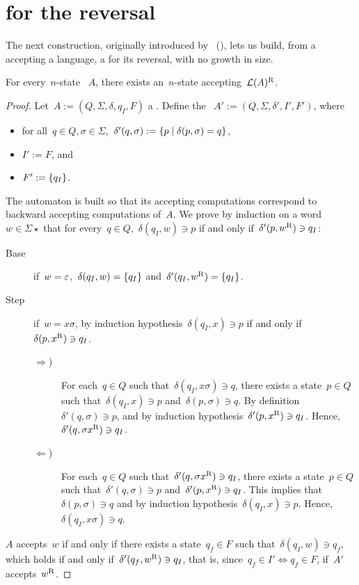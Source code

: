 \section{\texorpdfstring{\ONFA}{1NFA} for the reversal}\label{sub:reversal}
The next construction, originally introduced by~\citeauthor{RabSco59} (\cite{RabSco59}), lets us build, from a \ONFA accepting a language, a \ONFA for its reversal, with no growth in size.
\begin{thrm}
	For every~$n$-state \ONFA~$A$, there exists an~$n$-state \ONFA accepting~$\mathcal L(A)^{\mathrm R}$.
\end{thrm}
\begin{proof}
	Let~$A:=(Q,\Sigma,\delta,q_I,F)$ a \ONFA.
	Define the \ONFA~$A':=(Q,\Sigma,\delta',I',F')$, where
	\begin{itemize}
		\item for all~$q\in Q,\sigma\in\Sigma$,~$\delta'(q,\sigma):=\{p \mid \delta(p,\sigma)=q\}$,
		\item $I':=F$, and
		\item $F':=\{q_I\}$.
	\end{itemize}
	The automaton is built so that its accepting computations correspond to backward accepting computations of~$A$.
	We prove by induction on a word~$w\in\Sigma\star$ that for every~$q\in Q$,~$\delta(q_I,w)\ni p$ if and only if~$\delta'(p,w^{\mathrm R})\ni q_I$:
	\begin{description}
		\item[Base] if~$w=\varepsilon$,~$\delta(q_I,w)=\{q_I\}$ and~$\delta'(q_I,w^{\mathrm R})=\{q_I\}$.
		\item[Step] if~$w=x\sigma$, by induction hypothesis~$\delta(q_I,x)\ni p$ if and only if~$\delta(p,x^{\mathrm R})\ni q_I$.
		      \begin{description}
			      \item[$\Rightarrow$)] For each~$q\in Q$ such that~$\delta(q_I,x\sigma)\ni q$, there exists a state~$p\in Q$ such that~$\delta(q_I,x)\ni p$ and~$\delta(p,\sigma)\ni q$.
			            By definition~$\delta'(q,\sigma)\ni p$, and by induction hypothesis~$\delta'(p,x^{\mathrm R})\ni q_I$. Hence,~$\delta'(q,\sigma x^{\mathrm R})\ni q_I$.
			      \item[$\Leftarrow$)] For each~$q\in Q$ such that~$\delta'(q,\sigma x^{\mathrm R})\ni q_I$, there exists a state~$p\in Q$ such that~$\delta'(q,\sigma)\ni p$ and~$\delta'(p,x^{\mathrm R})\ni q_I$.
			            This implies that $\delta(p,\sigma)\ni q$ and by induction hypothesis~$\delta(q_I,x)\ni p$. Hence, $\delta(q_I,x\sigma)\ni q$.
		      \end{description}
	\end{description}
	$A$ accepts~$w$ if and only if there exists a state~$q_f\in F$ such that~$\delta(q_I,w)\ni q_f$, which holds if and only if~$\delta'(q_f,w^{\mathrm R})\ni q_I$, that is, since~$q_f\in I'\iff q_f\in F$, if~$A'$ accepts~$w^{\mathrm R}$.
\end{proof}
